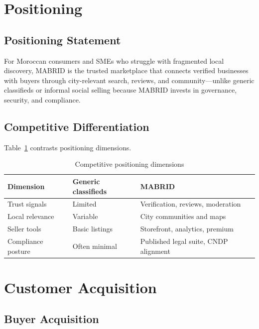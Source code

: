 \section{Positioning}

\subsection{Positioning Statement}

For Moroccan consumers and SMEs who struggle with fragmented local discovery, MABRID is the trusted marketplace that connects verified businesses with buyers through city-relevant search, reviews, and community---unlike generic classifieds or informal social selling because MABRID invests in governance, security, and compliance.

\subsection{Competitive Differentiation}

Table~\ref{tab:positioning} contrasts positioning dimensions.

\begin{table}[H]
  \centering
  \caption{Competitive positioning dimensions}
  \label{tab:positioning}
  \begin{tabularx}{\textwidth}{@{}lXX@{}}
    \toprule
    \textbf{Dimension} & \textbf{Generic classifieds} & \textbf{MABRID} \\
    \midrule
    Trust signals & Limited & Verification, reviews, moderation \\
    Local relevance & Variable & City communities and maps \\
    Seller tools & Basic listings & Storefront, analytics, premium \\
    Compliance posture & Often minimal & Published legal suite, CNDP alignment \\
    \bottomrule
  \end{tabularx}
\end{table}

\section{Customer Acquisition}

\subsection{Buyer Acquisition}


